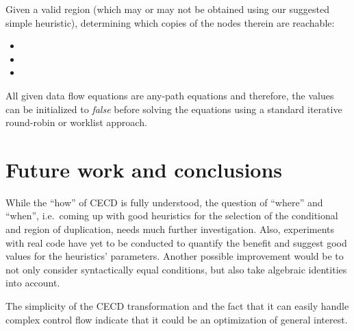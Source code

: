 \documentclass[halfparskip]{scrartcl}
\begin{document}
Given a valid region  (which may or may not be obtained using our suggested simple heuristic), determining which copies of the nodes therein are reachable:
\begin{itemize}
\item 
\item 
\item 
\end{itemize}

All given data flow equations are any-path equations and therefore, the values can be initialized to \textit{false} before solving the equations using a standard iterative round-robin or worklist approach.

\section{Future work and conclusions}

While the “how” of CECD is fully understood, the question of “where” and “when”, i.e.\ coming up with good heuristics for the selection of the conditional and region of duplication, needs much further investigation. Also, experiments with real code have yet to be conducted to quantify the benefit and suggest good values for the heuristics’ parameters. Another possible improvement would be to not only consider syntactically equal conditions, but also take algebraic identities into account.

The simplicity of the CECD transformation and the fact that it can easily handle complex control flow indicate that it could be an optimization of general interest.



\end{document}
